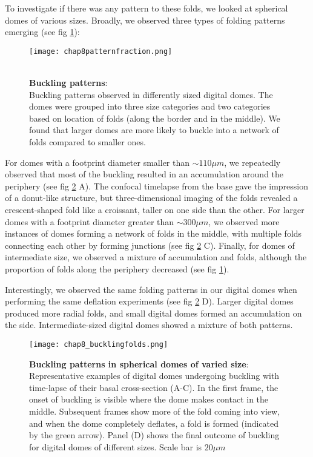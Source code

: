 To investigate if there was any pattern to these folds, we looked at spherical domes of various sizes. Broadly, we observed three types of folding patterns emerging (see fig \ref{fig_8_8}):

\begin{figure}[h!]
	\begin{minipage}[c]{0.5\textwidth}
		\texttt{[image: chap8patternfraction.png]}
	\end{minipage}\hfill
	\begin{minipage}[c]{0.45\textwidth}
		\caption{\\ \textbf{Buckling patterns}:\\ 
		Buckling patterns observed in differently sized digital domes. The domes were grouped into three size categories and two categories based on location of folds (along the border and in the middle). We found that larger domes are more likely to buckle into a network of folds compared to smaller ones.
		} \label{fig_8_8}
	\end{minipage}
\end{figure}

For domes with a footprint diameter smaller than $\sim 110 \mu m$, we repeatedly observed that most of the buckling resulted in an accumulation around the periphery (see fig \ref{fig_8_5} A). The confocal timelapse from the base gave the impression of a donut-like structure, but three-dimensional imaging of the folds revealed a crescent-shaped fold like a croissant, taller on one side than the other. For larger domes with a footprint  diameter greater than $\sim 300 \mu m$, we observed more instances of domes forming a network of folds in the middle, with multiple folds connecting each other by forming junctions (see fig \ref{fig_8_5} C). Finally, for domes of intermediate size, we observed a mixture of accumulation and folds, although the proportion of folds along the periphery decreased (see fig \ref{fig_8_8}).

Interestingly, we observed the same folding patterns in our digital domes when performing the same deflation experiments (see fig \ref{fig_8_5} D). Larger digital domes produced more radial folds, and small digital domes formed an accumulation on the side. Intermediate-sized digital domes showed a mixture of both patterns.

\begin{figure}
	\centering
	\texttt{[image: chap8\_bucklingfolds.png]}
	\caption{\label{fig_8_5} \textbf{Buckling patterns in spherical domes of varied size}: Representative examples of digital domes undergoing buckling with time-lapse of their basal cross-section (A-C). In the first frame, the onset of buckling is visible where the dome makes contact in the middle. Subsequent frames show more of the fold coming into view, and when the dome completely deflates, a fold is formed (indicated by the green arrow). Panel (D) shows the final outcome of buckling for digital domes of different sizes. Scale bar is $20 \mu m$	}
\end{figure}


